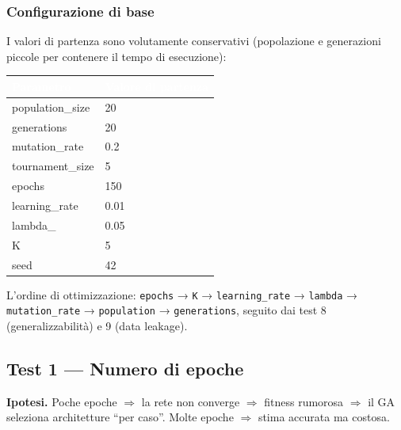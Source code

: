\documentclass[11pt,a4paper]{article}
\begin{document}
\subsubsection{Configurazione di base}

I valori di partenza sono volutamente conservativi (popolazione e
generazioni piccole per contenere il tempo di esecuzione):

\begin{center}
\begin{tabular}{ll}
    \toprule
    \rowcolor{headerblue}
    \textcolor{white}{\textbf{Parametro}} & \textcolor{white}{\textbf{Valore di partenza}} \\
    \midrule
    population\_size  & 20    \\
    \rowcolor{rowgray}
    generations       & 20    \\
    mutation\_rate    & 0.2   \\
    \rowcolor{rowgray}
    tournament\_size  & 5     \\
    epochs            & 150   \\
    \rowcolor{rowgray}
    learning\_rate    & 0.01  \\
    lambda\_          & 0.05  \\
    \rowcolor{rowgray}
    K                 & 5     \\
    seed              & 42    \\
    \bottomrule
\end{tabular}
\end{center}

L'ordine di ottimizzazione: \texttt{epochs} → \texttt{K} →
\texttt{learning\_rate} → \texttt{lambda} → \texttt{mutation\_rate} →
\texttt{population} → \texttt{generations}, seguito dai test 8
(generalizzabilità) e 9 (data leakage).

\subsection{Test 1 — Numero di epoche}

\textbf{Ipotesi.} Poche epoche $\Rightarrow$ la rete non converge
$\Rightarrow$ fitness rumorosa $\Rightarrow$ il GA seleziona architetture
``per caso''. Molte epoche $\Rightarrow$ stima accurata ma costosa.
\end{document}
